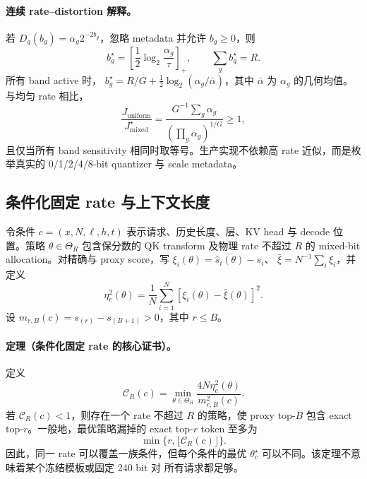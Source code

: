 \paragraph{连续 rate--distortion 解释。}
若 $D_g(b_g)=\alpha_g2^{-2b_g}$，忽略 metadata 并允许 $b_g\ge0$，则
\begin{equation}
 b_g^\star=\left[\frac12\log_2\frac{\alpha_g}{\tau}\right]_+,
 \qquad \sum_gb_g^\star=R.
 \label{eq:waterfilling-bits}
\end{equation}
所有 band active 时，
$b_g^\star=R/G+\frac12\log_2(\alpha_g/\bar\alpha)$，其中
$\bar\alpha$ 为 $\alpha_g$ 的几何均值。与均匀 rate 相比，
\begin{equation}
 \frac{J_{\mathrm{uniform}}}{J_{\mathrm{mixed}}^\star}
 =
 \frac{G^{-1}\sum_g\alpha_g}
      {(\prod_g\alpha_g)^{1/G}}\ge1,
 \label{eq:uniform-mixed-ratio}
\end{equation}
且仅当所有 band sensitivity 相同时取等号。生产实现不依赖高 rate
近似，而是枚举真实的 0/1/2/4/8-bit quantizer 与 scale metadata。

\subsection{条件化固定 rate 与上下文长度}

令条件 $c=(x,N,\ell,h,t)$ 表示请求、历史长度、层、KV head 与 decode
位置。策略 $\theta\in\Theta_R$ 包含保分数的 QK transform 及物理 rate
不超过 $R$ 的 mixed-bit allocation。对精确与 proxy score，写
$\xi_i(\theta)=\widehat s_i(\theta)-s_i$、
$\bar\xi=N^{-1}\sum_i\xi_i$，并定义
\begin{equation}
 \eta_c^2(\theta)=\frac1N\sum_{i=1}^{N}
 [\xi_i(\theta)-\bar\xi(\theta)]^2 .
\end{equation}
设 $m_{r,B}(c)=s_{(r)}-s_{(B+1)}>0$，其中 $r\le B$。

\paragraph{定理（条件化固定 rate 的核心证书）。}
定义
\begin{equation}
 \mathcal C_R(c)=
 \min_{\theta\in\Theta_R}
 \frac{4N\eta_c^2(\theta)}{m_{r,B}^2(c)} .
 \label{eq:fixed-rate-core-certificate}
\end{equation}
若 $\mathcal C_R(c)<1$，则存在一个 rate 不超过 $R$ 的策略，使 proxy
top-$B$ 包含 exact top-$r$。一般地，最优策略漏掉的 exact top-$r$ token
至多为
\begin{equation}
 \min\{r,\lfloor\mathcal C_R(c)\rfloor\}.
 \label{eq:conditional-fixed-rate-misses}
\end{equation}
因此，同一 rate 可以覆盖一族条件，但每个条件的最优
$\theta_c^\star$ 可以不同。该定理不意味着某个冻结模板或固定 240 bit 对
所有请求都足够。


